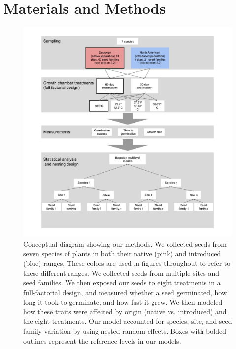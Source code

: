 \documentclass[11pt]{article}\usepackage[]{graphicx}\usepackage[]{color}
\begin{document}
	\section{Materials and Methods}
		\begin{figure} 
		\centering
		\includegraphics[scale=.65]{design}
		\caption{Conceptual diagram showing our methods. We collected seeds from seven species of plants in both their native (pink) and introduced (blue) ranges. These colors are used in figures throughout to refer to these different ranges. We collected seeds from multiple sites and seed families. We then exposed our seeds to eight treatments in a full-factorial design, and measured whether a seed germinated, how long it took to germinate, and how fast it grew. We then modeled how these traits were affected by origin (native vs. introduced) and the eight treatments. Our model accounted for species, site, and seed family variation by using nested random effects. Boxes with bolded outlines represent the reference levels in our models. } %
		\label{fig:design}
	\end{figure}
\end{document}
